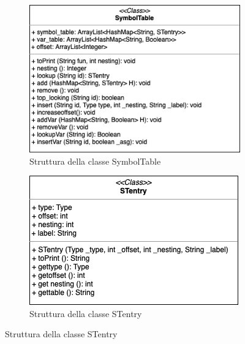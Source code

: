 \begin{figure}[h]
\centering
\begin{subfigure}{.45\textwidth}
  \centering
  \includegraphics[width=1\linewidth]{Images/ST_structure.png}
  \caption{Struttura della classe SymbolTable}
  \label{fig:STstructure}
\end{subfigure}
\begin{subfigure}{.45\textwidth}
  \centering
  \includegraphics[width=1\linewidth]{Images/STentry _structure.png}
  \caption{Struttura della classe STentry}
  \label{fig:STentrystructure}
\end{subfigure}
\end{figure}

